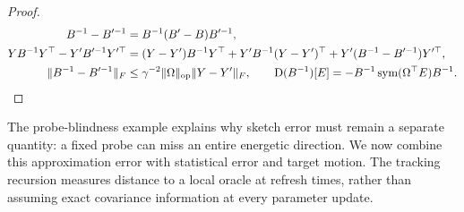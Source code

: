 \begin{proof}
\begin{align}
 B^{-1}-B'^{-1}&=B^{-1}(B'-B)B'^{-1},\\
 YB^{-1}Y^\top-Y'B'^{-1}Y'^\top
 &=(Y-Y')B^{-1}Y^\top+Y'B^{-1}(Y-Y')^\top
                       +Y'(B^{-1}-B'^{-1})Y'^\top,\\
 \|B^{-1}-B'^{-1}\|_F
 &\le\gamma^{-2}\|\Omega\|_{\mathrm{op}}\|Y-Y'\|_F,\qquad
 \mathrm D(B^{-1})[E]=-B^{-1}\operatorname{sym}(\Omega^\top E)B^{-1}.
\end{align}
\end{proof}
The probe-blindness example explains why sketch error must remain a separate
quantity: a fixed probe can miss an entire energetic direction. We now combine
this approximation error with statistical error and target motion. The
tracking recursion measures distance to a local oracle at refresh times, rather
than assuming exact covariance information at every parameter update.

